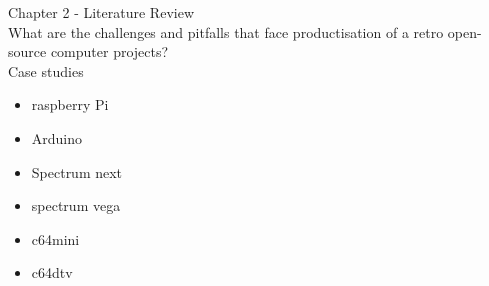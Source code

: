\documentclass[10pt,a4paper]{article}
\begin{document}
\large{Chapter 2 - Literature Review}\\
What are the challenges and pitfalls that face productisation of a retro open-source computer projects?
\\ Case studies
\\\begin{itemize}
\item raspberry Pi
\item Arduino
\item Spectrum next
\item spectrum vega
\item c64mini
\item c64dtv
\end{itemize}  
\end{document}
